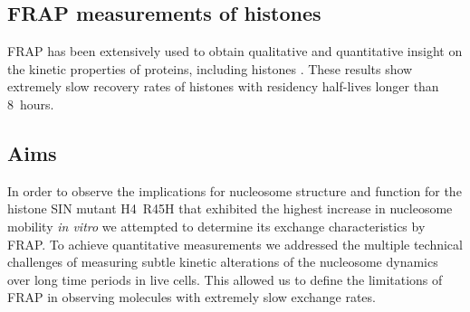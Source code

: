   \subsection{FRAP measurements of histones}

    FRAP has been extensively used to obtain qualitative and quantitative
    insight on the kinetic properties of proteins, including histones \citep{KimuraCook}.
    These results show extremely slow recovery rates
    of histones with residency half-lives longer than 8~hours.

  \subsection{Aims}

    In order to observe the implications for nucleosome structure and function for
    the histone SIN mutant H4~R45H that exhibited the
    highest increase in nucleosome mobility \textit{in vitro}
    we attempted to determine its exchange characteristics by FRAP.
    To achieve quantitative measurements we addressed the multiple technical challenges 
    of measuring subtle kinetic alterations of the nucleosome dynamics 
    over long time periods in live cells. This allowed us to define 
    the limitations of FRAP in observing molecules with extremely slow exchange rates.
